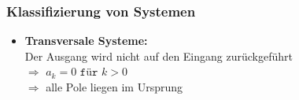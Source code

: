 \subsubsection{Klassifizierung von Systemen}
\begin{mdframed}[style=exercise]
	\begin{itemize}
		\item \textbf{Transversale Systeme:}\\
		      Der Ausgang wird nicht auf den Eingang zurückgeführt\\
		      $\Rightarrow$ $a_k=0 \texttt{ für } k>0$\\
		      $\Rightarrow$ alle Pole liegen im Ursprung

\end{itemize}
\end{mdframed}
